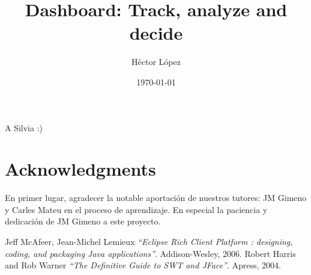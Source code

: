 \documentclass[a4paper,12pt,english]{book}
\newenvironment{dedication}
{
   \cleardoublepage
   \thispagestyle{empty}
   \vspace*{\stretch{1}}
   \hfill\begin{minipage}[t]{0.15\textwidth}
   \raggedright
}%
{
   \end{minipage}
   \vspace*{\stretch{3}}
   \clearpage
}
\begin{document}
\title{Dashboard: Track, analyze and decide}
\author{Héctor López}

\date{\today}
\maketitle

\begin{dedication}
A Silvia :)
\end{dedication}

%

\tableofcontents

\chapter*{Acknowledgments}

En primer lugar, agradecer la notable aportación de nuestros tutores: JM Gimeno y
Carles Mateu en el proceso de aprendizaje. En especial la paciencia y dedicación
de JM Gimeno a este proyecto. \\


%
%




%
%

\begin{thebibliography}{1}

	 Jeff McAfeer, Jean-Michel Lemieux
		{\em ``Eclipse Rich Client Platform : designing, coding, and packaging Java
		applications''}. Addison-Wesley, 2006.
	 Robert Harris and Rob Warner
		{\em ``The Definitive Guide to SWT and JFace''}. Apress, 2004.
	\bibitem{}{}
\end{thebibliography}
\end{document}
